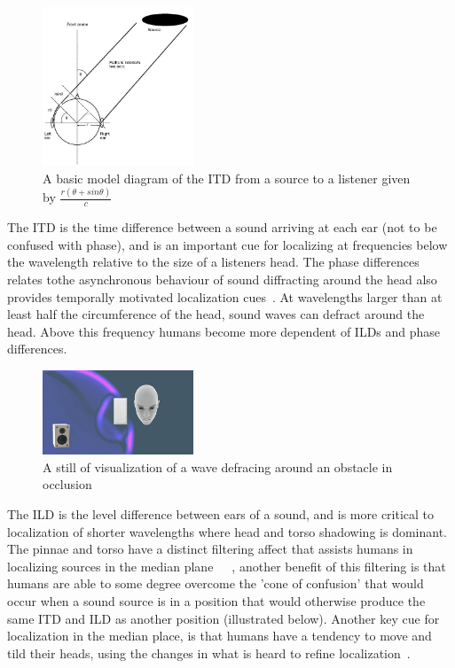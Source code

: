 \documentclass[paper=a4, fontsize=10pt, font=arial]{scrartcl} %
\numberwithin{equation}{section} %
\numberwithin{figure}{section} %
\numberwithin{table}{section} %
\begin{document}
\begin{figure}[H]
\centering
\includegraphics[width=0.4\textwidth]{itdexample.jpg}
\centering
\caption{A basic model diagram of the ITD from a source to a listener given by $\frac{r(\theta + sin \theta)}{\textit{c}}$ ~\cite{rumsey2012spatial}}
\end{figure} 

The ITD is the time difference between a sound arriving at each ear (not to be confused with phase), and is an important cue for localizing at frequencies below the wavelength relative to the size of a listeners head. The phase differences relates tothe asynchronous behaviour of sound diffracting around the head also provides temporally motivated localization cues~\cite{Aaronson2014}. At wavelengths larger than at least half the circumference of the head, sound waves can defract around the head. Above this frequency humans become more dependent of ILDs and phase differences. 

\begin{figure}[H]
\centering
\includegraphics[width=0.4\textwidth]{defractionexample.JPG}
\centering
\caption{A still of visualization of a wave defracing around an obstacle in occlusion ~\cite{googlevr2016}}
\end{figure} 

The ILD is the level difference between ears of a sound, and is more critical to localization of shorter wavelengths where head and torso shadowing is dominant. The pinnae and torso have a distinct filtering affect that assists humans in localizing sources in the median plane~\cite{Blauert1997}~\cite{Begault1995}~\cite{Wiggins2004}, another benefit of this filtering is that humans are able to some degree overcome the 'cone of confusion' that would occur when a sound source is in a position that would otherwise produce the same ITD and ILD as another position (illustrated below). Another key cue for localization in the median place, is that humans have a tendency to move and tild their heads, using the changes in what is heard to refine localization~\cite{Blauert1997}.
\end{document}
